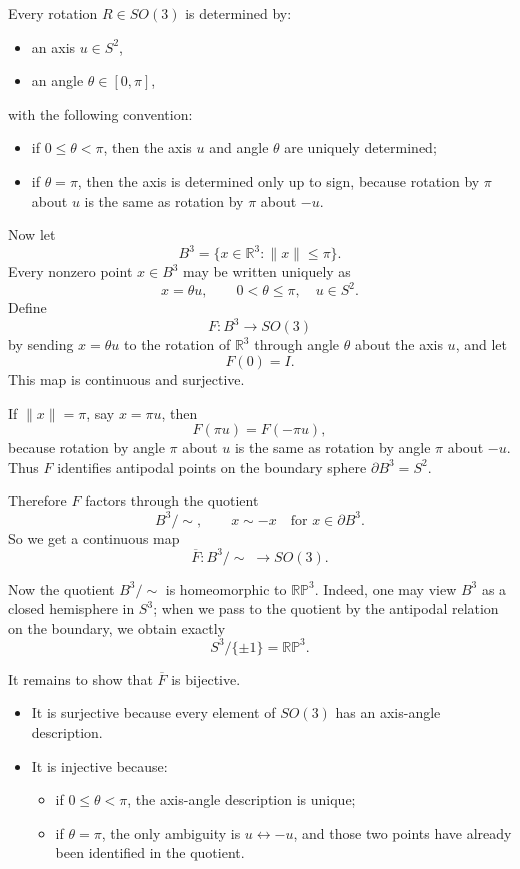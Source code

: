 \documentclass[12pt,a4paper]{article}
\theoremstyle{notespace}
\begin{document}
Every rotation \(R\in SO(3)\) is determined by:

\begin{itemize}
	\item an axis \(u\in S^2\),
	\item an angle \(\theta\in [0,\pi]\),
\end{itemize}
with the following convention:

\begin{itemize}
	\item if \(0\le \theta<\pi\), then the axis \(u\) and angle \(\theta\) are uniquely determined;
	\item if \(\theta=\pi\), then the axis is determined only up to sign, because rotation by \(\pi\) about \(u\) is the same as rotation by \(\pi\) about \(-u\).
\end{itemize}

Now let
\[
B^3=\{x\in \mathbb R^3:\|x\|\le \pi\}.
\]
Every nonzero point \(x\in B^3\) may be written uniquely as
\[
x=\theta u,
\qquad
0<\theta\le \pi,\quad u\in S^2.
\]
Define
\[
F:B^3\to SO(3)
\]
by sending \(x=\theta u\) to the rotation of \(\mathbb R^3\) through angle \(\theta\) about the axis \(u\), and let
\[
F(0)=I.
\]
This map is continuous and surjective.

If \(\|x\|=\pi\), say \(x=\pi u\), then
\[
F(\pi u)=F(-\pi u),
\]
because rotation by angle \(\pi\) about \(u\) is the same as rotation by angle \(\pi\) about \(-u\). Thus \(F\) identifies antipodal points on the boundary sphere \(\partial B^3=S^2\).

Therefore \(F\) factors through the quotient
\[
B^3/\!\sim,
\qquad
x\sim -x \quad \text{for } x\in \partial B^3.
\]
So we get a continuous map
\[
\overline{F}:B^3/\!\sim\;\to SO(3).
\]

Now the quotient \(B^3/\!\sim\) is homeomorphic to \(\mathbb{RP}^3\). Indeed, one may view \(B^3\) as a closed hemisphere in \(S^3\); when we pass to the quotient by the antipodal relation on the boundary, we obtain exactly
\[
S^3/\{\pm 1\}=\mathbb{RP}^3.
\]

It remains to show that \(\overline{F}\) is bijective.

\begin{itemize}
	\item It is surjective because every element of \(SO(3)\) has an axis-angle description.
	\item It is injective because:
	\begin{itemize}
		\item if \(0\le \theta<\pi\), the axis-angle description is unique;
		\item if \(\theta=\pi\), the only ambiguity is \(u\leftrightarrow -u\), and those two points have already been identified in the quotient.
	\end{itemize}
\end{itemize}
\end{document}
